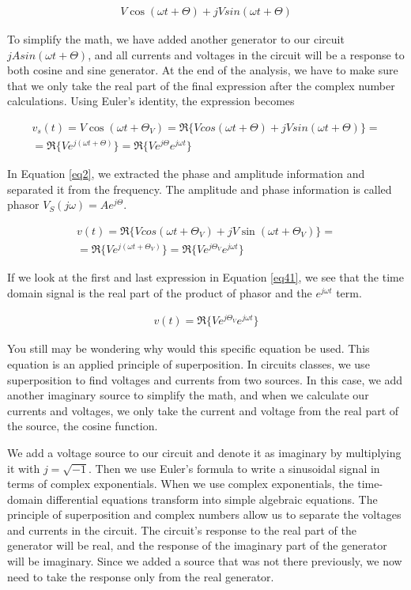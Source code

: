 \documentclass{ximera}
\begin{document}
\begin{eqnarray}
 V \cos (\omega t + \Theta ) + j V sin (\omega t + \Theta) 
\end{eqnarray}

To simplify the math, we have added another generator to our circuit $j A sin (\omega t + \Theta)$, and all currents and voltages in the circuit will be a response to both cosine and sine generator. At the end of the analysis,  we have to make sure that we only take the real part of the final expression after the complex number calculations. Using
 Euler's identity, the expression becomes


\begin{eqnarray}
v_s(t)=  V \cos (\omega t + \Theta_V)=\Re\{ V cos (\omega t + \Theta ) + j V sin (\omega t + \Theta)\}= \nonumber \\ 
= \Re\{V e^{j(\omega t + \Theta)}\}=\Re\{V e^{j \Theta} e^{j \omega t}\} \label{eq2}
\end{eqnarray}

In Equation \ref{eq2}, we extracted the phase and amplitude information
and separated it from the frequency. The amplitude and phase information is called phasor $V_S (j \omega)=A e^{j \Theta}$. 
 
\begin{eqnarray}
v(t)= \Re\{ V cos (\omega t + \Theta_V ) + j V \sin (\omega t + \Theta_V)\}= \nonumber \\ =\Re\{V e^{j(\omega t + \Theta_V)}\}=\Re\{V e^{j \Theta_V} e^{j \omega t}\} \label{eq41}
\end{eqnarray}

If we look at the first and last expression in Equation \ref{eq41}, we see that the time domain signal is the real part of the product of phasor and the $e^{j \omega t}$ term. 

\begin{eqnarray}
v(t)=\Re\{V e^{j \Theta_V} e^{j \omega t}\} \label{eq41a} 
\end{eqnarray}



You still may be wondering why would this specific equation be used. This equation is an applied principle of superposition. In circuits classes, we use superposition to find voltages and currents from two sources. In this case, we add another imaginary source to simplify the math, and when we calculate our currents and voltages, we only take the current and voltage from the real part of the source, the cosine function.

We add a voltage source to our circuit and denote it as imaginary by multiplying it with $j=\sqrt{-1}$. Then we use Euler's formula to write a sinusoidal signal in terms of complex exponentials. When we use complex exponentials, the time-domain differential equations transform into simple algebraic equations. The principle of superposition and complex numbers allow us to separate the voltages and currents in the circuit. The circuit's response to the real part of the generator will be real, and the response of the imaginary part of the generator will be imaginary. Since we added a source that was not there previously, we now need to take the response only from the real generator.
\end{document}
